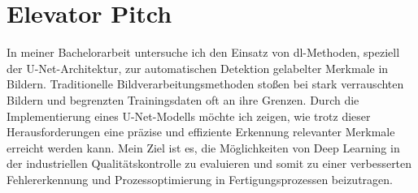 \chapter{Elevator Pitch}\label{sec:exp_elevator}
In meiner Bachelorarbeit untersuche ich den Einsatz von \gls{dl}-Methoden, speziell der U-Net-Architektur, zur automatischen Detektion gelabelter Merkmale in Bildern. Traditionelle Bildverarbeitungsmethoden stoßen bei stark verrauschten Bildern und begrenzten Trainingsdaten oft an ihre Grenzen. Durch die Implementierung eines U-Net-Modells möchte ich zeigen, wie trotz dieser Herausforderungen eine präzise und effiziente Erkennung relevanter Merkmale erreicht werden kann. Mein Ziel ist es, die Möglichkeiten von Deep Learning in der industriellen Qualitätskontrolle zu evaluieren und somit zu einer verbesserten Fehlererkennung und Prozessoptimierung in Fertigungsprozessen beizutragen.







